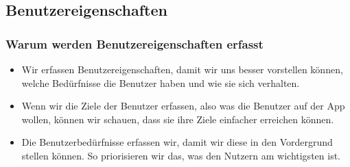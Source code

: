 \documentclass[10pt]{article}
\begin{document}
	\subsection{Benutzereigenschaften}
	\subsubsection{Warum werden Benutzereigenschaften erfasst}
	\begin{itemize}
		\item Wir erfassen Benutzereigenschaften, damit wir uns besser vorstellen können, welche Bedürfnisse die Benutzer haben und wie sie sich verhalten.
		\item Wenn wir die Ziele der Benutzer erfassen, also was die Benutzer auf der App wollen, können wir schauen, dass sie ihre Ziele einfacher erreichen können.\
		\item Die Benutzerbedürfnisse erfassen wir, damit wir diese in den Vordergrund stellen können. So priorisieren wir das, was den Nutzern am wichtigsten ist.
	\end{itemize}
\end{document}
